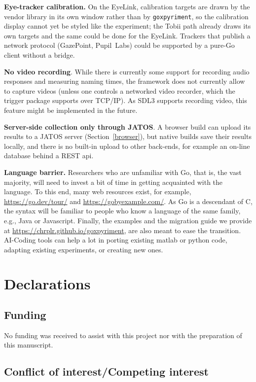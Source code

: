 \documentclass[doc,a4paper,floatsintext]{apa7}
\begin{document}
\textbf{Eye-tracker calibration.} On the EyeLink, calibration targets
are drawn by the vendor library in its own window rather than by
\texttt{goxpyriment}, so the calibration display cannot yet be styled
like the experiment; the Tobii path already draws its own targets and
the same could be done for the EyeLink. Trackers that publish a
network protocol (GazePoint, Pupil~Labs) could be supported by a
pure-Go client without a bridge.

\textbf{No video recording}. While there is currently some support for
recording audio responses and measuring naming times, the framework
does not currently allow to capture videos (unless one controls a
networked video recorder, which the trigger package supports over
TCP/IP).  As SDL3 supports recording video, this feature might be
implemented in the future.

\textbf{Server-side collection only through JATOS}.  A browser build
can upload its results to a JATOS server (Section~\ref{browser}), but
native builds save their results locally, and there is no built-in
upload to other back-ends, for example an on-line database behind a
REST api.

\textbf{Language barrier.}  Researchers who are unfamiliar with Go,
that is, the vast majority, will need to invest a bit of time in
getting acquainted with the language.  To this end, many web resources
exist, for example, \url{https://go.dev/tour/} and
\url{https://gobyexample.com/}. As Go is a descendant of C, the syntax
will be familiar to people who know a language of the same family,
e.g., Java or Javascript. Finally, the examples and the migration
guide we provide at \url{https://chrplr.github.io/goxpyriment}, are
also meant to ease the transition. AI-Coding tools can help a lot in
porting existing matlab or python code, adapting existing experiments,
or creating new ones.

\clearpage

\section{Declarations}

\subsection{Funding}

No funding was received to assist with this project nor with the preparation of this manuscript.

\subsection{Conflict of interest/Competing interest}
\end{document}
